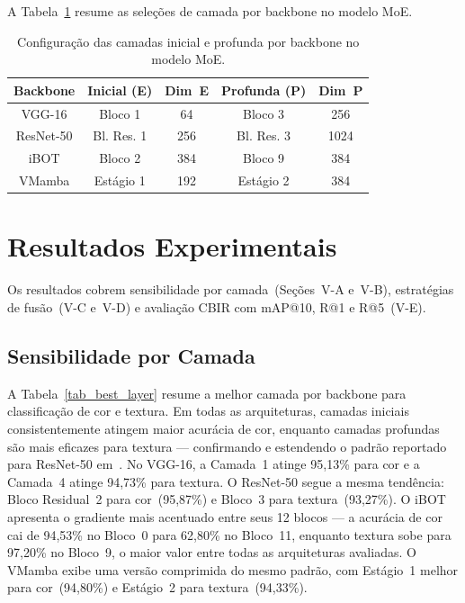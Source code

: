 \documentclass[conference]{IEEEtran}
\begin{document}
A Tabela~\ref{tab_moe_config} resume as sele\c{c}\~{o}es de camada por
backbone no modelo MoE.

\begin{table}[htbp]
\caption{Configura\c{c}\~{a}o das camadas inicial e profunda por backbone
         no modelo MoE.}
\begin{center}
\begin{tabular}{c|c|c|c|c}
\hline
\textbf{Backbone} & \textbf{Inicial (E)} & \textbf{Dim~E}
                  & \textbf{Profunda (P)} & \textbf{Dim~P} \\
\hline
VGG-16    & Bloco 1      & 64   & Bloco 3      & 256  \\
ResNet-50 & Bl. Res. 1   & 256  & Bl. Res. 3   & 1024 \\
iBOT      & Bloco 2      & 384  & Bloco 9      & 384  \\
VMamba    & Est\'{a}gio 1 & 192  & Est\'{a}gio 2 & 384  \\
\hline
\end{tabular}
\label{tab_moe_config}
\end{center}
\end{table}

\section{Resultados Experimentais}

Os resultados cobrem sensibilidade por camada~(Se\c{c}\~{o}es~V-A e~V-B),
estrat\'{e}gias de fus\~{a}o~(V-C e~V-D) e avalia\c{c}\~{a}o CBIR com
mAP@10, R@1 e R@5~(V-E).

\subsection{Sensibilidade por Camada}

A Tabela~\ref{tab_best_layer} resume a melhor camada por backbone para
classifica\c{c}\~{a}o de cor e textura.
Em todas as arquiteturas, camadas iniciais consistentemente atingem maior
acur\'{a}cia de cor, enquanto camadas profundas s\~{a}o mais eficazes
para textura --- confirmando e estendendo o padr\~{a}o reportado para
ResNet-50 em~\cite{b2}.
No VGG-16, a Camada~1 atinge 95,13\% para cor e a Camada~4 atinge 94,73\%
para textura.
O ResNet-50 segue a mesma tend\^{e}ncia: Bloco Residual~2 para
cor~(95,87\%) e Bloco~3 para textura~(93,27\%).
O iBOT apresenta o gradiente mais acentuado entre seus 12 blocos ---
a acur\'{a}cia de cor cai de 94,53\% no Bloco~0 para 62,80\% no
Bloco~11, enquanto textura sobe para 97,20\% no Bloco~9, o maior valor
entre todas as arquiteturas avaliadas.
O VMamba exibe uma vers\~{a}o comprimida do mesmo padr\~{a}o, com
Est\'{a}gio~1 melhor para cor~(94,80\%) e Est\'{a}gio~2 para
textura~(94,33\%).
\end{document}

